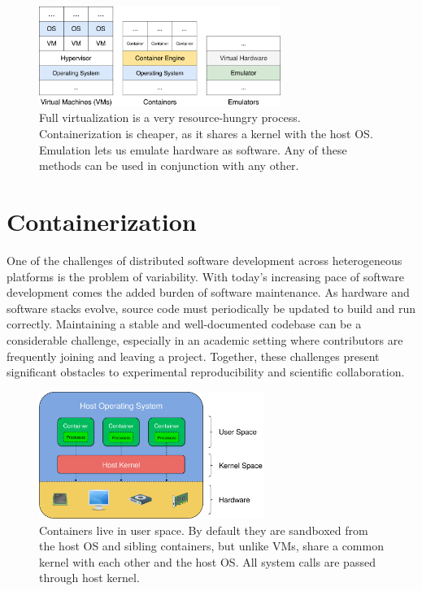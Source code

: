 \documentclass[12pt,initial,twoside,maitrise]{dms}
\numberwithin{equation}{section}
\numberwithin{table}{chapter}
\numberwithin{figure}{chapter}
\begin{document}
\begin{figure}
    \centering
    \includegraphics[width=0.70\textwidth]{../figures/vms_containers_emulators.png}
    \caption{Full virtualization is a very resource-hungry process. Containerization is cheaper, as it shares a kernel with the host OS. Emulation lets us emulate hardware as software. Any of these methods can be used in conjunction with any other.\vspace{-10pt}}
    \label{fig:vms_containers_emulators}
\end{figure}

\section{Containerization}\label{sec:containerization}

One of the challenges of distributed software development across heterogeneous platforms is the problem of variability. With today's increasing pace of software development comes the added burden of software maintenance. As hardware and software stacks evolve, source code must periodically be updated to build and run correctly. Maintaining a stable and well-documented codebase can be a considerable challenge, especially in an academic setting where contributors are frequently joining and leaving a project. Together, these challenges present significant obstacles to experimental reproducibility and scientific collaboration.

\begin{figure}[ht]
    \centering
    \includegraphics[width=0.65\textwidth]{../figures/user_kernel_hardware.png}
    \caption{Containers live in user space. By default they are sandboxed from the host OS and sibling containers, but unlike VMs, share a common kernel with each other and the host OS. All system calls are passed through host kernel.}
    \label{fig:user_kernel_hardware}
\end{figure}
\end{document}
